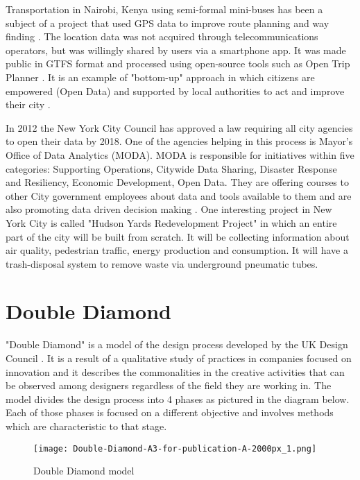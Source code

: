 Transportation in Nairobi, Kenya using semi-formal mini-buses has been a subject of a project that used GPS data to improve route planning and way finding \citep{klopp2015leveraging}. The location data was not acquired through telecommunications operators, but was willingly shared by users via a smartphone app. It was made public in GTFS format and processed using open-source tools such as Open Trip Planner \citep{klopp2015leveraging}. It is an example of "bottom-up" approach in which citizens are empowered (Open Data) and supported by local authorities to act and improve their city \citep{Neirotti2014}.

In 2012 the New York City Council has approved a law requiring all city agencies to open their data by 2018. One of the agencies helping in this process is Mayor's Office of Data Analytics (MODA). MODA is responsible for initiatives within five categories: Supporting Operations, Citywide Data Sharing, Disaster Response and Resiliency, Economic Development, Open Data. They are offering courses to other City government employees about data and tools available to them and are also promoting data driven decision making \citep{NYCMODA2014}. One interesting project in New York City is called "Hudson Yards Redevelopment Project" in which an entire part of the city will be built from scratch. It will be collecting information about air quality, pedestrian traffic, energy production and consumption. It will have a trash-disposal system to remove waste via underground pneumatic tubes.

	\section{Double Diamond}
	
"Double Diamond" is a model of the design process developed by the UK Design Council \citep{council2007eleven, council2005double}. It is a result of a qualitative study of practices in companies focused on innovation and it describes the commonalities in the creative activities that can be observed among designers regardless of the field they are working in. The model divides the design process into 4 phases as pictured in the diagram below. Each of those phases is focused on a different objective and involves methods which are characteristic to that stage.

\begin{figure}[h!]
\centering
     \texttt{[image: Double-Diamond-A3-for-publication-A-2000px\_1.png]}
      \caption{Double Diamond model \citep{council2005double} }
       \label{normal_case}
\end{figure}

